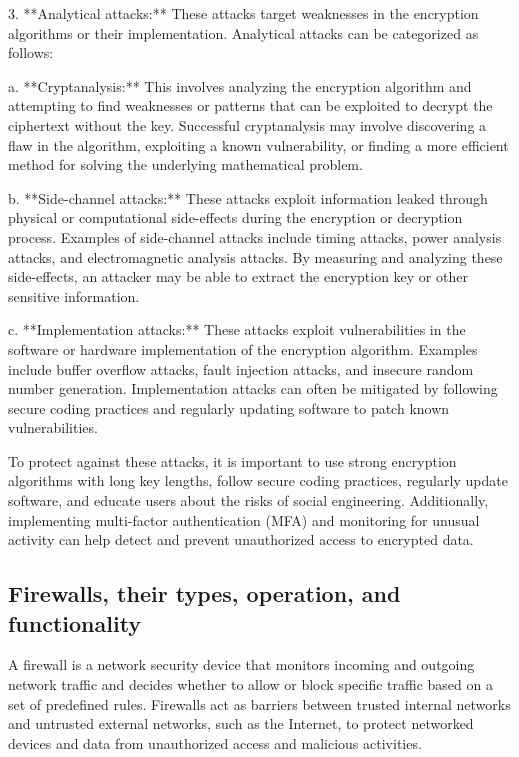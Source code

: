 \documentclass{article}
\begin{document}
3. **Analytical attacks:** These attacks target weaknesses in the encryption algorithms or their implementation. Analytical attacks can be categorized as follows:

   a. **Cryptanalysis:** This involves analyzing the encryption algorithm and attempting to find weaknesses or patterns that can be exploited to decrypt the ciphertext without the key. Successful cryptanalysis may involve discovering a flaw in the algorithm, exploiting a known vulnerability, or finding a more efficient method for solving the underlying mathematical problem.
   
   b. **Side-channel attacks:** These attacks exploit information leaked through physical or computational side-effects during the encryption or decryption process. Examples of side-channel attacks include timing attacks, power analysis attacks, and electromagnetic analysis attacks. By measuring and analyzing these side-effects, an attacker may be able to extract the encryption key or other sensitive information.
   
   c. **Implementation attacks:** These attacks exploit vulnerabilities in the software or hardware implementation of the encryption algorithm. Examples include buffer overflow attacks, fault injection attacks, and insecure random number generation. Implementation attacks can often be mitigated by following secure coding practices and regularly updating software to patch known vulnerabilities.

To protect against these attacks, it is important to use strong encryption algorithms with long key lengths, follow secure coding practices, regularly update software, and educate users about the risks of social engineering. Additionally, implementing multi-factor authentication (MFA) and monitoring for unusual activity can help detect and prevent unauthorized access to encrypted data.


\subsection{Firewalls, their types, operation, and functionality}

A firewall is a network security device that monitors incoming and outgoing network traffic and decides whether to allow or block specific traffic based on a set of predefined rules. Firewalls act as barriers between trusted internal networks and untrusted external networks, such as the Internet, to protect networked devices and data from unauthorized access and malicious activities.
\end{document}
